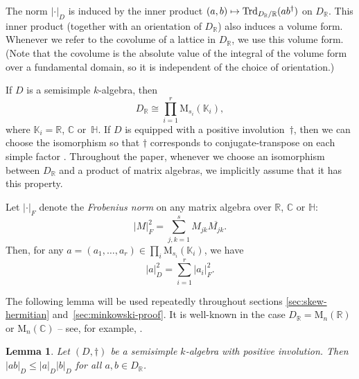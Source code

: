 \documentclass[11pt]{article}
\numberwithin{equation}{section}
\def\mto{\mathchoice{\longmapsto}{\mapsto}{\mapsto}{\mapsto}}
\newcommand{\bC}{\mathbb{C}}
\newcommand{\bH}{\mathbb{H}}
\newcommand{\bK}{\mathbb{K}}
\newcommand{\bR}{\mathbb{R}}
\newcommand{\rM}{\mathrm{M}}
\DeclareMathOperator{\Trd}{Trd}
\newcommand{\abs}[1]{\lvert #1 \rvert}
\let\ov\overline
\newcommand{\defterm}[1]{\emph{#1}}
\newtheorem{lemma}{Lemma}[section]
\begin{document}
The norm $\abs{\cdot}_D$ is induced by the inner product $(a,b) \mto \Trd_{D_\bR/\bR}(ab^\dag)$ on $D_\bR$.
This inner product (together with an orientation of $D_\bR$) also induces a volume form. Whenever we refer to the covolume of a lattice in $D_\bR$, we use this volume form.
(Note that the covolume is the absolute value of the integral of the volume form over a fundamental domain, so it is independent of the choice of orientation.)

If $D$ is a semisimple $k$-algebra, then
\[
D_\bR \cong \prod_{i=1}^r \rM_{s_i}(\bK_i),
\]
where $\bK_i = \bR$, $\bC$ or~$\bH$.
If $D$ is equipped with a positive involution~$\dag$, then we can choose the isomorphism so that $\dag$ corresponds to conjugate-transpose on each simple factor \cite[Prop.\,8.4.7]{Voi21}.
Throughout the paper, whenever we choose an isomorphism between $D_\bR$ and a product of matrix algebras, we implicitly assume that it has this property.

Let $\abs{\cdot}_F$ denote the \defterm{Frobenius norm} on any matrix algebra over $\bR$, $\bC$ or $\bH$:
\[
\abs{M}_F^2 = \sum_{j,k=1}^s M_{jk} \ov{M_{jk}}.
\]
Then, for any $a = (a_1, \dotsc, a_r) \in \prod_i \rM_{s_i}(\bK_i)$, we have
\[
\abs{a}_D^2 = \sum_{i=1}^r \abs{a_i}_F^2.
\]

The following lemma will be used repeatedly throughout sections \ref{sec:skew-hermitian} and~\ref{sec:minkowski-proof}. It is well-known in the case $D_\bR = \rM_n(\bR)$ or $\rM_n(\bC)$ -- see, for example, \cite[p.\,291]{HJ85}.

\begin{lemma} \label{length-submult}
Let $(D, \dag)$ be a semisimple $k$-algebra with positive involution.
Then $\abs{ab}_D \leq \abs{a}_D \abs{b}_D$ for all $a, b \in D_\bR$.
\end{lemma}
\end{document}
